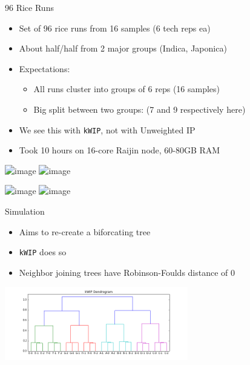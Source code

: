 \documentclass[t]{beamer}
\begin{document}
\begin{frame}{96 Rice Runs}
  \begin{itemize}
    \item Set of 96 rice runs from 16 samples (6 tech reps ea)
    \item About half/half from 2 major groups (Indica, Japonica)
    \item Expectations:
      \begin{itemize}
        \item All runs cluster into groups of 6 reps (16 samples)
        \item Big split between two groups: (7 and 9 respectively here)
      \end{itemize}
    \item We see this with \texttt{kWIP}, not with Unweighted IP
    \item Took 10 hours on 16-core Raijin node, 60-80GB RAM
  \end{itemize}
\end{frame}

\begin{frame}
  \begin{center}
    \includegraphics<1>[width=\textwidth]{img/distmat-both.png}
    \includegraphics<2>[width=\textwidth]{img/dendro-both.png}
  \end{center}
\end{frame}

\begin{frame}
  \begin{center}
    \includegraphics<1>[width=0.6\textwidth]{img/dendro-wip.png}
    \includegraphics<2>[width=0.6\textwidth]{img/dendro-ip.png}
  \end{center}
\end{frame}

\begin{frame}{Simulation}
  \begin{itemize}
    \item Aims to re-create a biforcating tree
    \item \texttt{kWIP} does so
    \item Neighbor joining trees have Robinson-Foulds distance of 0
  \end{itemize}
  \begin{center}
    \includegraphics[width=0.6\textwidth]{img/kwip-dendro.png}
  \end{center}
\end{frame}
\end{document}
